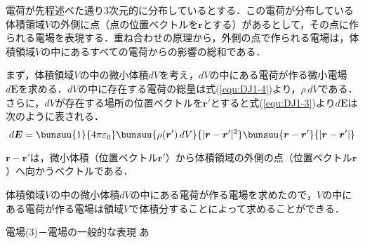 電荷が先程述べた通り3次元的に分布しているとする．この電荷が分布している体積領域$V$の外側に点（点の位置ベクトルを$\bm{r}$とする）があるとして，その点に作られる電場を表現する．重ね合わせの原理から，外側の点で作られる電場は，体積領域$V$の中にあるすべての電荷からの影響の総和である．

まず，体積領域$V$の中の微小体積$dV$を考え，$dV$の中にある電荷が作る微小電場$d\bm{E}$を求める．$dV$の中に存在する電荷の総量は式(\ref{equ:DJ1-4})より，$\rho\,dV$である．さらに，$dV$が存在する場所の位置ベクトルを$\bm{r}'$とすると式(\ref{equ:DJ1-3})より$d\bm{E}$は次のように表される．
\begin{equation}
	d\bm{E} = \bunsuu{1}{4\pi\varepsilon_0}\bunsuu{\rho(\bm{r}')\,dV}{|\bm{r} - \bm{r}'|^2}\bunsuu{\bm{r} - \bm{r}'}{|\bm{r} - \bm{r}'|}
\end{equation}

$\bm{r} - \bm{r}'$は，微小体積（位置ベクトル$\bm{r}'$）から体積領域の外側の点（位置ベクトル$\bm{r}$）へ向かうベクトルである．

体積領域$V$の中の微小体積$dV$の中にある電荷が作る電場を求めたので，$V$の中にある電荷が作る電場は領域$V$で体積分することによって求めることができる．

\begin{kousiki}{電場(3)－電場の一般的な表現}
	あ
\end{kousiki}